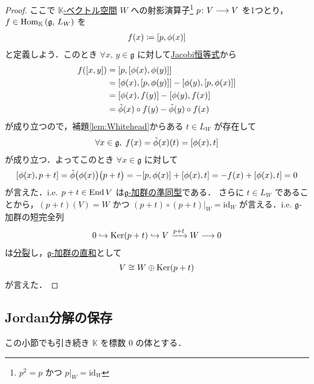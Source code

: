 \documentclass[rep_main]{subfiles}
\begin{document}
\begin{proof}
	ここで \underline{$\mathbb{K}$-ベクトル空間} $W$ への射影演算子\footnote{$p^2 = p$ かつ $p|_W = \mathrm{id}_W$} $p \colon V \longrightarrow V$ を1つとり，$f \in \mathrm{Hom}_{\mathbb{K}} \mathop{}(\mathfrak{g},\, L_W)$ を
	\begin{align}
		f(x) \coloneqq \comm{p}{\phi(x)}
	\end{align}
	と定義しよう．このとき $\forall x,\, y \in \mathfrak{g}$ に対して\hyperref[ax:LieAlg]{Jacobi恒等式}から
	\begin{align}
		f(\comm{x}{y})
		&= \comm{p}{\comm{\phi(x)}{\phi(y)}} \\
		&= \comm{\phi(x)}{\comm{p}{\phi(y)}} - \comm{\phi(y)}{\comm{p}{\phi(x)}} \\
		&= \comm{\phi(x)}{f(y)} - \comm{\phi(y)}{f(x)} \\
		&= \tilde{\phi}(x) \circ f(y) - \tilde{\phi}(y) \circ f(x)
	\end{align}
	が成り立つので，補題\ref{lem:Whitehead}からある $t \in L_W$ が存在して
	\begin{align}
		\forall x \in \mathfrak{g},\; f(x) = \tilde{\phi}(x)(t) = \comm{\phi(x)}{t}
	\end{align}
	が成り立つ．よってこのとき $\forall x \in \mathfrak{g}$ に対して
	\begin{align}
		\comm{\phi(x)}{p+t} = \tilde{\phi}\bigl(\phi(x)\bigr)\bigl( p+t \bigr) = - \comm{p}{\phi(x)} + \comm{\phi(x)}{t} = -f(x) + \comm{\phi(x)}{t} = 0
	\end{align}
	が言えた．i.e. $p+t \in \operatorname{End} V$ は\hyperref[def:g-module-hom]{$\mathfrak{g}$-加群の準同型}である．
	さらに $t \in L_W$ であることから，$(p+t)(V) = W$ かつ $(p+t) \circ (p+t)|_W = \mathrm{id}_W$ が言える．i.e. $\mathfrak{g}$-加群の短完全列
	\begin{align}
		0 \hookrightarrow \operatorname{Ker} (p+t) \hookrightarrow V \xrightarrow{p+t} W \longrightarrow 0
	\end{align}
	は\hyperref[prop:split]{分裂}し，\hyperref[def:gmod-directsum]{$\mathfrak{g}$-加群の直和}として
	\begin{align}
		V \cong W \oplus \operatorname{Ker} (p+t)
	\end{align}
	が言えた．
\end{proof}



\subsection{Jordan分解の保存}

この小節でも引き続き $\mathbb{K}$ を標数 $0$ の体とする．
\end{document}
